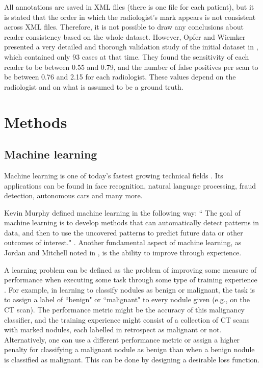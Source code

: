 \documentclass[12pt]{article}
\begin{document}
All annotations are saved in XML files (there is one file for each patient), but it is stated that the order in which the radiologist's mark appears is not consistent across XML files. Therefore, it is not possible to draw any conclusions about reader consistency based on the whole dataset. However, Opfer and Wiemker presented a very detailed and thorough validation study of the initial dataset in \citep{opfer2007performance}, which contained only 93 cases at that time. They found the sensitivity of each reader to be between 0.55 and 0.79, and the number of false positives per scan to be between 0.76 and 2.15 for each radiologist. These values depend on the radiologist and on what is assumed to be a ground truth. 


\section{Methods}

\subsection{Machine learning}
Machine learning is one of today's fastest growing technical fields \citep{Jordan255}. Its applications can be found in face recognition, natural language processing, fraud detection, autonomous cars and many more.

Kevin Murphy defined machine learning in the following way: `` The goal of machine learning is to develop methods that can automatically detect patterns in data, and then to use the uncovered patterns to predict future data or other outcomes of interest." \citep{murphy2012machine}. Another fundamental aspect of machine learning, as Jordan and Mitchell noted in \citep{Jordan255}, is the ability to improve through experience. 

A learning problem can be defined as the problem of improving some measure of performance when executing some task through some type of training experience \citep{Jordan255}. For example, in learning to classify nodules as benign or malignant, the task is to assign a label of ``benign" or ``malignant" to every nodule given (e.g., on the CT scan). The performance metric might be the accuracy of this malignancy classifier, and the training experience might consist of a collection of CT scans with marked nodules, each labelled in retrospect as malignant or not. Alternatively, one can use a different performance metric or assign a higher penalty for classifying a malignant nodule as benign than when a benign nodule is classified as malignant. This can be done by designing a desirable loss function.
\end{document}
